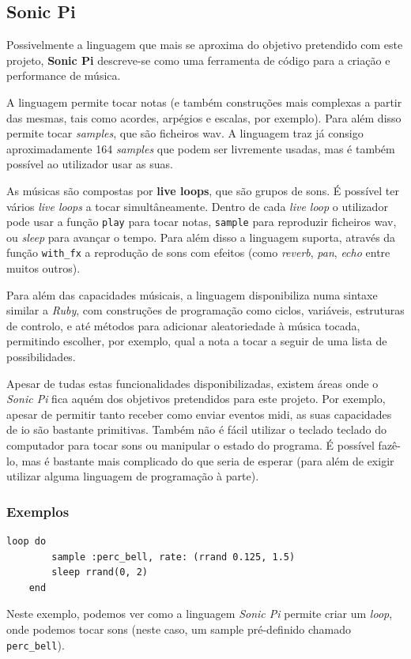 \documentclass[
  oneside,
  11pt, a4paper,
  footinclude=true,
  headinclude=true,
  cleardoublepage=empty
]{scrbook}
\begin{document}
	\subsection{Sonic Pi}
	Possivelmente a linguagem que mais se aproxima do objetivo pretendido com este projeto, \textbf{Sonic Pi}\cite{sonic-pi} descreve-se como uma ferramenta de código para a criação e performance de música.
	
	A linguagem permite tocar notas (e também construções mais complexas a partir das mesmas, tais como acordes, arpégios e escalas, por exemplo). Para além disso permite tocar \textit{samples}, que são ficheiros \acrfull{wav}. A linguagem traz já consigo aproximadamente 164 \textit{samples} que podem ser livremente usadas, mas é também possível ao utilizador usar as suas.
	
	As músicas são compostas por \textbf{live loops}, que são grupos de sons. É possível ter vários \textit{live loops} a tocar simultâneamente. Dentro de cada \textit{live loop} o utilizador pode usar a função \texttt{play} para tocar notas, \texttt{sample} para reproduzir ficheiros \acrshort{wav}, ou \textit{sleep} para avançar o tempo. Para além disso a linguagem suporta, através da função \texttt{with\_fx} a reprodução de sons com efeitos (como \textit{reverb}, \textit{pan}, \textit{echo} entre muitos outros\cite{sonic-pi-fx}).
	
	Para além das capacidades músicais, a linguagem disponibiliza numa sintaxe similar a \textit{Ruby}, com construções de programação como ciclos, variáveis, estruturas de controlo, e até métodos para adicionar aleatoriedade à música tocada, permitindo escolher, por exemplo, qual a nota a tocar a seguir de uma lista de possibilidades.
	
	Apesar de tudas estas funcionalidades disponibilizadas, existem áreas onde o \textit{Sonic Pi} fica aquém dos objetivos pretendidos para este projeto. Por exemplo, apesar de permitir tanto receber como enviar eventos \acrshort{midi}, as suas capacidades de \acrfull{io} são bastante primitivas. Também não é fácil utilizar o teclado teclado do computador para tocar sons ou manipular o estado do programa. É possível fazê-lo, mas é bastante mais complicado do que seria de esperar (para além de exigir utilizar alguma linguagem de programação à parte).
	
	\subsubsection{Exemplos}
	\begin{lstlisting}[caption={Reproduzir um \textit{sample} com valores aleatórios}] 
    loop do
        sample :perc_bell, rate: (rrand 0.125, 1.5)
        sleep rrand(0, 2)
    end
    \end{lstlisting}
    Neste exemplo, podemos ver como a linguagem \textit{Sonic Pi} permite criar um \textit{loop}, onde podemos tocar sons (neste caso, um sample pré-definido chamado \texttt{perc\_bell}).
    
\end{document}
